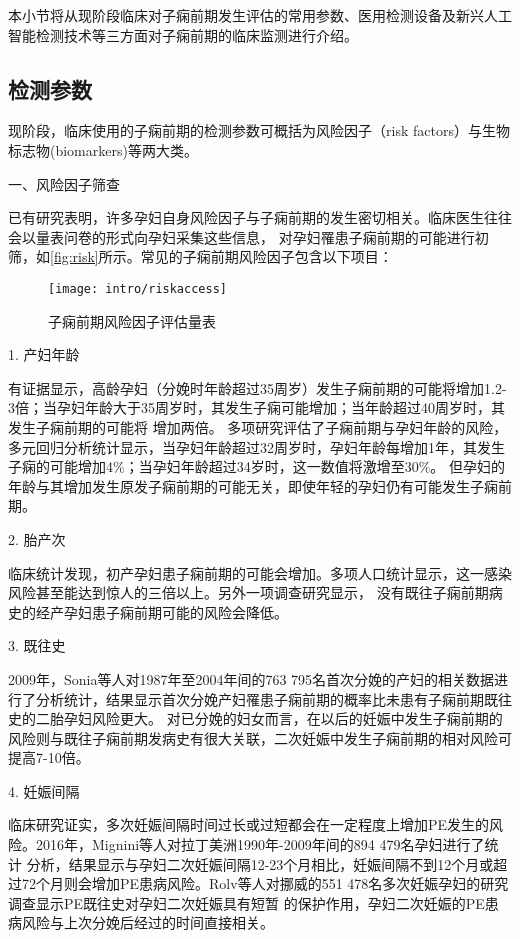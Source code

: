 本小节将从现阶段临床对子痫前期发生评估的常用参数、医用检测设备及新兴人工智能检测技术等三方面对子痫前期的临床监测进行介绍。
\subsection{检测参数}
现阶段，临床使用的子痫前期的检测参数可概括为风险因子（risk factors）与生物标志物(biomarkers)等两大类。

一、风险因子筛查

已有研究表明，许多孕妇自身风险因子与子痫前期的发生密切相关\cite{Magee2008,FIGO,Lowe2015,Heazell2010}。临床医生往往会以量表问卷的形式向孕妇采集这些信息，
对孕妇罹患子痫前期的可能进行初筛\cite{risks}，如\autoref{fig:risk}所示。常见的子痫前期风险因子包含以下项目：
\begin{figure}[htbp]
    \centering
    \texttt{[image: intro/riskaccess]}
    \caption[子痫前期风险因子评估量表]{\label{fig:risk}子痫前期风险因子评估量表\cite{risks}}
\end{figure}

1. 产妇年龄

有证据显示，高龄孕妇（分娩时年龄超过35周岁）发生子痫前期的可能将增加1.2-3倍；当孕妇年龄大于35周岁时，其发生子痫可能增加；当年龄超过40周岁时，其发生子痫前期的可能将
增加两倍\cite{Duckitt2005,FIGO,Yogev2010}。
多项研究评估了子痫前期与孕妇年龄的风险，多元回归分析统计显示，当孕妇年龄超过32周岁时，孕妇年龄每增加1年，其发生子痫的可能增加4\%；当孕妇年龄超过34岁时，这一数值将激增至30\%。
但孕妇的年龄与其增加发生原发子痫前期的可能无关，即使年轻的孕妇仍有可能发生子痫前期\cite{Duckitt2005,Poon2010}。

2. 胎产次

临床统计发现，初产孕妇患子痫前期的可能会增加。多项人口统计显示，这一感染风险甚至能达到惊人的三倍以上\cite{Lee2000,Duckitt2005,Coonrod1995}。另外一项调查研究显示，
没有既往子痫前期病史的经产孕妇患子痫前期可能的风险会降低\cite{Robillard1993}。

3. 既往史

2009年，Sonia等人对1987年至2004年间的763 795名首次分娩的产妇的相关数据进行了分析统计，结果显示首次分娩产妇罹患子痫前期的概率比未患有子痫前期既往史的二胎孕妇风险更大\cite{Sonia2009}。
对已分娩的妇女而言，在以后的妊娠中发生子痫前期的风险则与既往子痫前期发病史有很大关联，二次妊娠中发生子痫前期的相对风险可提高7-10倍\cite{Duckitt2005,CAMPBELL1985,Lie1998,Sibai1986}。

4. 妊娠间隔

临床研究证实，多次妊娠间隔时间过长或过短都会在一定程度上增加PE发生的风险\cite{Rousso2002,Duckitt2005,Conde2007}。2016年，Mignini等人\cite{Mignini2016}对拉丁美洲1990年-2009年间的894 479名孕妇进行了统计
分析，结果显示与孕妇二次妊娠间隔12-23个月相比，妊娠间隔不到12个月或超过72个月则会增加PE患病风险。Rolv\cite{Rolv2002}等人对挪威的551 478名多次妊娠孕妇的研究调查显示PE既往史对孕妇二次妊娠具有短暂
的保护作用，孕妇二次妊娠的PE患病风险与上次分娩后经过的时间直接相关。

